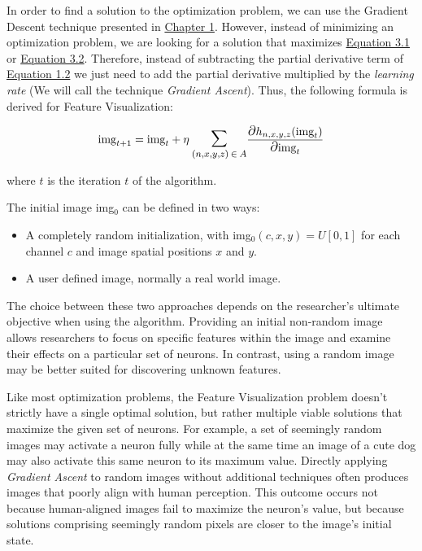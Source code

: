 In order to find a solution to the optimization problem, we can use the Gradient Descent technique presented in \hyperref[sec:gradient_descent]{Chapter 1}.
However, instead of minimizing an optimization problem, we are looking for a solution that maximizes \hyperref[eq:feat_vis_optimization]{Equation 3.1} or \hyperref[eq:feat_vis_optimization_multivar]{Equation 3.2}.
Therefore, instead of subtracting the partial derivative term of \hyperref[eq:gradient_descent]{Equation 1.2} we just need to add the partial derivative multiplied by the \emph{learning rate} (We will call the technique \emph{Gradient Ascent}). 
Thus, the following formula is derived for Feature Visualization:

\begin{equation}
    \text{img}_{t + 1} = \text{img}_t + \eta \: \mathlarger{\mathlarger{\sum}}_{(n, x, y, z) \: \in \: A} \frac{\mathlarger{\mathlarger{\partial}} h_{n, x, y, z} (\text{img}_t)}{\mathlarger{\mathlarger{\partial}} \text{img}_t}
    \label{eq:feat_vis_formula}
\end{equation}

\noindent where \(t\) is the iteration \(t\) of the algorithm. 

The initial image img\(_0\) can be defined in two ways:

\begin{itemize}
    \item A completely random initialization, with img\(_0(c, x, y) = U[0, 1]\) for each channel \(c\) and image spatial positions \(x\) and \(y\).
    \item A user defined image, normally a real world image.
\end{itemize}

The choice between these two approaches depends on the researcher's ultimate objective when using the algorithm.
Providing an initial non-random image allows researchers to focus on specific features within the image and examine their effects on a particular set of neurons. 
In contrast, using a random image may be better suited for discovering unknown features.

Like most optimization problems, the Feature Visualization problem doesn't strictly have a single optimal solution, but rather multiple viable solutions that maximize the given set of neurons.
For example, a set of seemingly random images may activate a neuron fully while at the same time an image of a cute dog may also activate this same neuron to its maximum value.
Directly applying \emph{Gradient Ascent} to random images without additional techniques often produces images that poorly align with human perception. This outcome occurs not because human-aligned images fail to maximize the neuron's value, but because solutions comprising seemingly random pixels are closer to the image's initial state.

